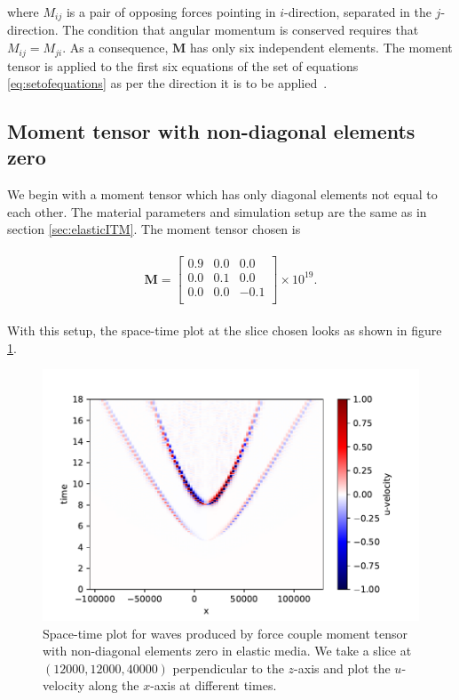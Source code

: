 where $M_{ij}$ is a pair of opposing forces pointing in $i$-direction, separated in the $j$-direction. The condition that angular momentum is conserved requires that $M_{ij} = M_{ji}$. As a consequence, $\mathbf{M}$ has only six independent elements. The moment tensor is applied to the first six equations of the set of equations \ref{eq:setofequations} as per the direction it is to be applied~\parencite{10.1785/0120060253}.
\subsection{Moment tensor with non-diagonal elements zero}
We begin with a moment tensor which has only diagonal elements not equal to each other. The material parameters and simulation setup are the same as in section \ref{sec:elasticITM}. The moment tensor chosen is

\begin{align}
    \begin{split}
        \mathbf{M} =
            \begin{bmatrix}
                0.9 & 0.0 &0.0 \\
                0.0 & 0.1 & 0.0 \\
                0.0 & 0.0 & -0.1 \\
            \end{bmatrix} \times 10^{19} .
    \end{split}
\end{align}

With this setup, the space-time plot at the slice chosen looks as shown in figure \ref{fig:space-timeplot-doublecouplediagnoITM}.

\begin{figure}[htpb]
    \centering
    \includegraphics[width=0.75\linewidth]{figures/double-couple-diag-noITM.pdf}
    \caption{Space-time plot for waves produced by force couple moment tensor with non-diagonal elements zero in elastic media. We take a slice at $\left(12000,12000,40000\right)$ perpendicular to the $z$-axis and plot the $u$-velocity along the $x$-axis at different times.}
    \label{fig:space-timeplot-doublecouplediagnoITM}
\end{figure}

